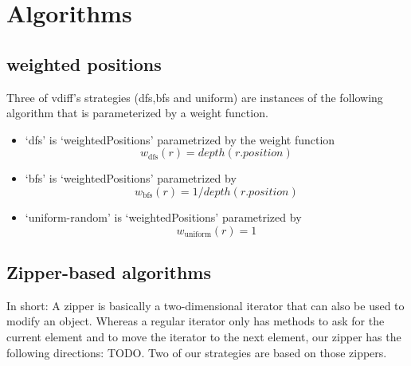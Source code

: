 \documentclass{article}
\begin{document}
\section{Algorithms}

\subsection{weighted positions}
Three of vdiff's strategies (dfs,bfs and uniform) are instances of the following
algorithm that is parameterized by a weight function.

\begin{algorithm}
  \caption{weighted positions}
  \State $\textit{reads} \gets \Call{findAllReads}{tu}$
  \State $\textit{constants} \gets \Call{findAllConstants}{tu}$
  \State $\textit{weights} \gets \text{map $w$ $reads$} $
      \State $r \gets \text{randomly draw from $reads$ with weights $weights$}$
      \State $constant \gets ite(\text{randomBool()}
      , \text{constants.lookup(r.type)}
      , \Call{randomValue}{r.type})$
      \State let $assertion = \texttt{r.variable != constant}$ 
      \State $tu' \gets$ insert(tu, $assertion$, r.position)
      \State $result \gets \text{verify}(tu')}$
  \EndFor
\end{algorithm}
\begin{itemize}
\item `dfs' is `weightedPositions' parametrized by the weight function
  \[
    w_{\text{dfs}}(r) = depth (r.position)
  \]
\item `bfs' is `weightedPositions' parametrized by
  \[
    w_{\text{bfs}}(r) =  1 / depth(r.position)
  \]
\item `uniform-random' is `weightedPositions' parametrized by
  \[
    w_{\text{uniform}}(r) = 1
  \]
\end{itemize}

\subsection{Zipper-based algorithms}
In short: A zipper is basically a two-dimensional iterator that can also be used
to modify an object. Whereas a regular iterator only has methods to ask for the
current element and to move the iterator to the next element, our zipper has the
following directions: TODO.
Two of our strategies are based on those zippers.
\end{document}
